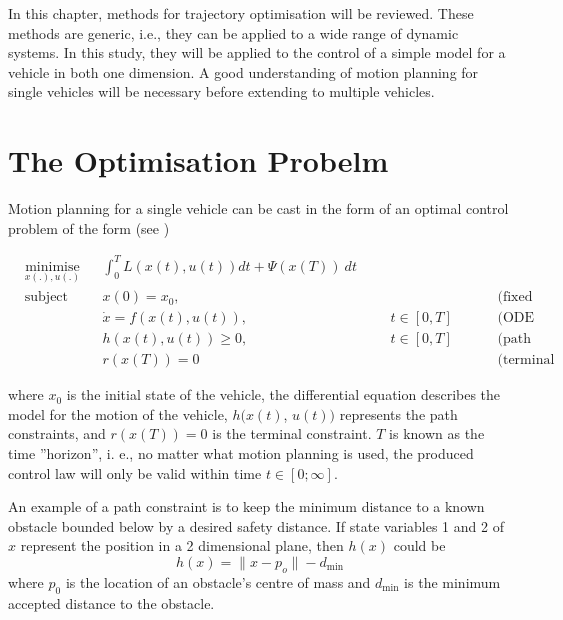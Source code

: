 %
\cleardoublepage%
\label{chap:theory}
 
\par In this chapter, methods for trajectory optimisation will be reviewed. These methods are generic, i.e., they can be applied to a wide range of dynamic systems. In this study, they will be applied to the control of a simple model for a vehicle in both one dimension. A good understanding of motion planning for single vehicles will be necessary before extending to multiple vehicles.

\section{The Optimisation Probelm}

\par Motion planning for a single vehicle can be cast in the form of an optimal control problem of the form (see \cite{diehl2006fast})

\begin{equation}
    \begin{aligned}
    & \underset{x(.),u(.)}{\text{minimise}} && \int_0^T L(x(t),u(t))dt + \Psi (x(T)) \ dt\\
    & \text{subject to}  && x(0) = x_0, &&& &&&& \text{(fixed initial value)} \\
        & && \dot{x} = f(x(t), u(t)), &&& t \in [0,T] &&&& \text{(ODE Model)}\\
        & && h(x(t),u(t)) \geq 0, &&&  t \in [0,T] &&&& \text{(path constraints)} &&&&&\\
        & && r(x(T)) = 0 &&& &&&& \text{(terminal constraints)} &&&&&
    \end{aligned}
    \label{eq:general_cost}
\end{equation}

where $x_0$ is the initial state of the vehicle, the differential equation describes the model for the motion of the vehicle, $h(x(t)$, $u(t))$ represents the path constraints, and $r(x(T))=0$ is the terminal constraint. $T$ is known as the time ”horizon”, i. e., no matter what motion planning is used, the produced control law will only be valid within time $t\in[0;\infty]$.


\par An example of a path constraint is to keep the minimum distance to a known obstacle bounded below by a desired safety distance. If state variables 1 and 2 of $x$ represent the position in a 2 dimensional plane, then $h(x)$ could be
\begin{equation}
    \label{eq:example_constr}
    h(x) = \lVert x - p_o \rVert - d_{\text{min}}
\end{equation}
where $p_0$ is the location of an obstacle's centre of mass and $d_{\text{min}}$ is the minimum accepted distance to the obstacle.

